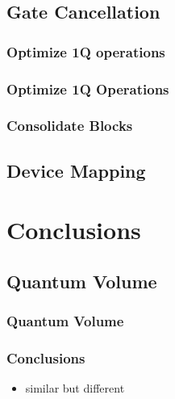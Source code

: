 \documentclass[aspectratio=169,11pt,hyperref={colorlinks=true}]{beamer}
\begin{document}
\subsection{Gate Cancellation}
\subsubsection{Optimize 1Q operations}
\begin{frame}
    \frametitle{Optimize 1Q Operations}
\end{frame}
\subsubsection{Consolidate Blocks}
\begin{frame}

\end{frame}
\subsection{Device Mapping}

\section{Conclusions}
\subsection{Quantum Volume}
\begin{frame}
    \frametitle{Quantum Volume\footnotemark[1]}

    \vspace{3em}
\end{frame}
\begin{frame}
    \frametitle{Conclusions}
    \begin{itemize}
        \item similar but different
    \end{itemize}
\end{frame}
\end{document}
